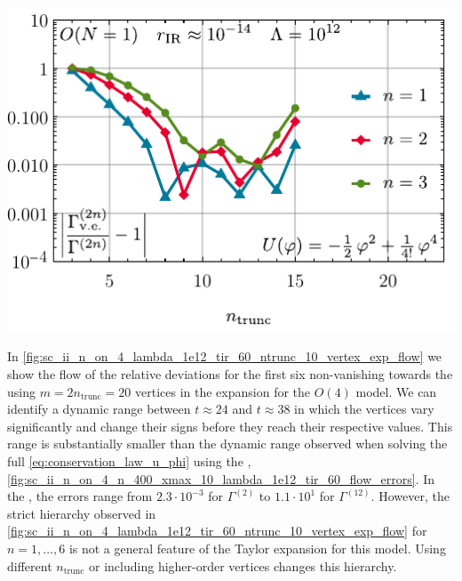 	{%
		\includegraphics[width=\subcaptionFigureWidth]{0d/figures/sc_ii_n_on_1_lambda_1e12_tir_60_vertex_exp_error.pdf} %
		\captionsetup{width=\subcaptionFigureWidth}%
		\caption{%
			The relative errors for $\Gamma^{(2n)}$ in the \ir{} for $n = 1, 2, 3$ for the $O (1)$ model, calculated via the \frg{} flow of the \frg{} Taylor expansion to order $m = 2 n_\mathrm{trunc}$ with $n_\mathrm{trunc} \in \{ 3, \ldots , 15 \}$ using the exponential regulator~\eqref{eq:exponential_regulator}.
			As initial condition we use the \uv{} potential \eqref{eq:testing_scenario_phi4}.
			The discrete results for integer $n_\mathrm{trunc}$ are connected by straight lines to improve readability and for a better trend analysis.
		}%
		\label{fig:sc_ii_n_on_1_lambda_1e12_tir_60_vertex_exp_error}
	}%
In \cref{fig:sc_ii_n_on_4_lambda_1e12_tir_60_ntrunc_10_vertex_exp_flow} we show the flow of the relative deviations for the first six non-vanishing \nptFunctions{} towards the \ir{} using $m = 2 n_\mathrm{trunc} = 20$ vertices in the expansion for the $O(4)$ model.
We can identify a dynamic range between $t \approx 24$ and $t \approx 38$ in which the vertices vary significantly and change their signs before they reach their respective \ir{} values.
This range is substantially smaller than the dynamic range observed when solving the full \pde{} \eqref{eq:conservation_law_u_phi} using the \ktScheme{}, \cf{} \cref{fig:sc_ii_n_on_4_n_400_xmax_10_lambda_1e12_tir_60_flow_errors}.
In the \ir{}, the errors range from $2.3 \cdot 10^{-3}$ for $\Gamma^{(2)}$ to $1.1 \cdot 10^{1}$ for $\Gamma^{(12)}$.
However, the strict hierarchy observed in \cref{fig:sc_ii_n_on_4_lambda_1e12_tir_60_ntrunc_10_vertex_exp_flow} for $n = 1, \ldots, 6$ is not a general feature of the Taylor expansion for this model.
Using different $n_\mathrm{trunc}$ or including higher-order vertices changes this hierarchy.

